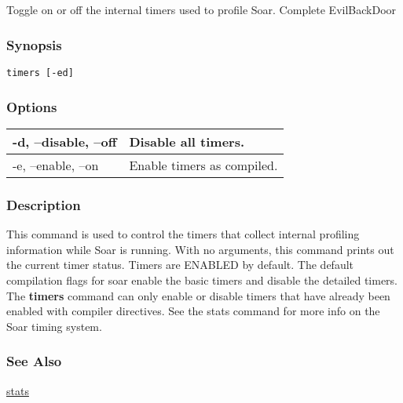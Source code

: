 \subsection{}
\label{timers}
Toggle on or off the internal timers used to profile Soar. 
 Complete EvilBackDoor
\subsubsection*{Synopsis}
\begin{verbatim}
timers [-ed]
\end{verbatim}
\subsubsection*{Options}
\begin{tabular}{|l|l|}
\hline 
 -d, --disable, --off  & Disable all timers.  \\
 \hline 
 -e, --enable, --on  & Enable timers as compiled.  \\
 \hline 
\end{tabular}
\subsubsection*{Description}
 This command is used to control the timers that collect internal profiling information while Soar is running. With no arguments, this command prints out the current timer status. Timers are ENABLED by default. The default compilation flags for soar enable the basic timers and disable the detailed timers. The \textbf{timers}
 command can only enable or disable timers that have already been enabled with compiler directives. See the stats command for more info on the Soar timing system. 
\subsubsection*{See Also}
\hyperref[stats]{stats} 